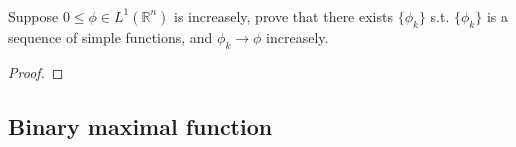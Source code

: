 \documentclass{amsart}
\theoremstyle{definition}
\theoremstyle{remark}
\numberwithin{equation}{section}
\begin{document}
\subsubsection{}
Suppose $0\leq\phi\in L^1(\mathbb{R}^n)$ is increasely, prove that there exists $\{\phi_k\}$ s.t. $\{\phi_k\}$ is a sequence of simple functions, and $\phi_k\to\phi$ increasely.
\begin{proof}
	
\end{proof}
\subsection{Binary maximal function}
\subsubsection{}
\end{document}
